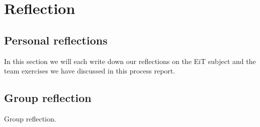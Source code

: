 \chapter{Reflection}
\label{chap:reflection}
\section{Personal reflections}
In this section we will each write down our reflections on the EiT subject and the team exercises we have discussed in this process report.

\section{Group reflection}
Group reflection.